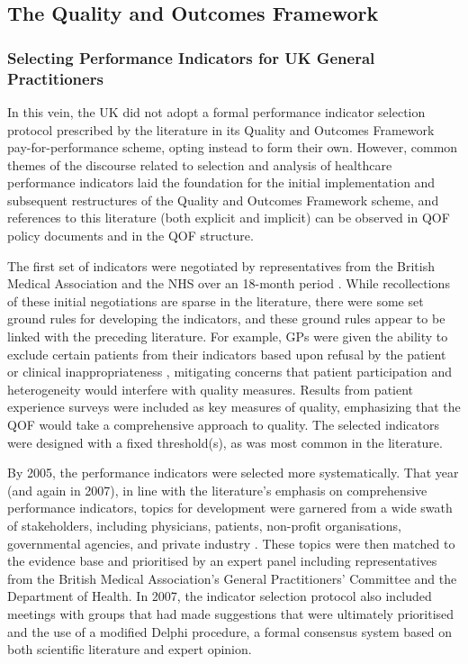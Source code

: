 \documentclass[12pt]{article}
\begin{document}
\subsection{The Quality and Outcomes Framework}


\subsubsection{Selecting Performance Indicators for UK General Practitioners}

In this vein, the UK did not adopt a formal performance indicator selection protocol prescribed by the literature in its Quality and Outcomes Framework pay-for-performance scheme, opting instead to form their own. However, common themes of the discourse related to selection and analysis of healthcare performance indicators laid the foundation for the initial implementation and subsequent restructures of the Quality and Outcomes Framework scheme, and references to this literature (both explicit and implicit) can be observed in QOF policy documents and in the QOF structure.

The first set of indicators were negotiated by representatives from the British Medical Association and the NHS over an 18-month period \citep{doranSettingPerformanceTargets2014}. While recollections of these initial negotiations are sparse in the literature, there were some set ground rules for developing the indicators, and these ground rules appear to be linked with the preceding literature. For example, GPs were given the ability to exclude certain patients from their indicators based upon refusal by the patient or clinical inappropriateness \citep{rolandQualityOutcomesFramework2016}, mitigating concerns that patient participation and heterogeneity would interfere with quality measures. Results from patient experience surveys were included as key measures of quality, emphasizing that the QOF would take a comprehensive approach to quality. The selected indicators were designed with a fixed threshold(s), as was most common in the literature.

By 2005, the performance indicators were selected more systematically. That year (and again in 2007), in line with the literature's emphasis on comprehensive performance indicators, topics for development were garnered from a wide swath of stakeholders, including physicians, patients, non-profit organisations, governmental agencies, and private industry \citep{lesterDevelopingQualityOutcomes2010}. These topics were then matched to the evidence base and prioritised by an expert panel including representatives from the British Medical Association's General Practitioners' Committee and the Department of Health. In 2007, the indicator selection protocol also included meetings with groups that had made suggestions that were ultimately prioritised and the use of a modified Delphi procedure, a formal consensus system based on both scientific literature and expert opinion.
\end{document}
